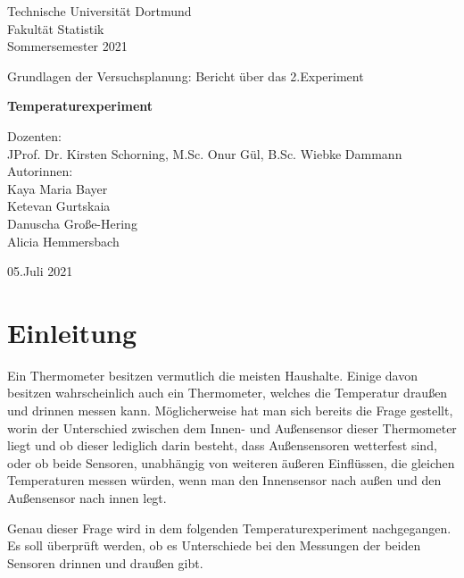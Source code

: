 \documentclass[ ngerman, fontsize= 12pt, paper=a4, headings=big, titlepage=true]{article}
\begin{document}
	
	
	\begin{center}
		\Large
		Technische Universität Dortmund\\
		Fakultät Statistik\\
		Sommersemester 2021\\
		
		\vspace{4em}
		
		Grundlagen der Versuchsplanung: Bericht über das 2.Experiment
		
		\Huge
		\textbf{Temperaturexperiment}
		
		\Large
		\vspace{5em}
		Dozenten:\\
		JProf. Dr. Kirsten Schorning, M.Sc. Onur Gül, B.Sc. Wiebke Dammann\\
		
		
		\vspace{8em}
		Autorinnen: \\
		Kaya Maria Bayer\\
		Ketevan Gurtskaia\\
		Danuscha Große-Hering\\	
		Alicia Hemmersbach\\
		
		
		
		\vspace{12em}
		
		05.Juli 2021
		
	\end{center}
	
	\newpage	
	
	\tableofcontents
	\newpage
	
	\section{Einleitung}
	Ein Thermometer besitzen vermutlich die meisten Haushalte. Einige davon besitzen wahrscheinlich auch ein Thermometer, welches die Temperatur draußen und drinnen messen kann. Möglicherweise hat man sich bereits die Frage gestellt, worin der Unterschied zwischen dem Innen- und Außensensor dieser Thermometer liegt und ob dieser lediglich darin besteht, dass Außensensoren wetterfest sind, oder ob beide Sensoren, unabhängig von weiteren äußeren Einflüssen, die gleichen Temperaturen messen würden, wenn man den Innensensor nach außen und den Außensensor nach innen legt. \newline 
	
	Genau dieser Frage wird in dem folgenden Temperaturexperiment nachgegangen. Es soll überprüft werden, ob es Unterschiede bei den Messungen der beiden Sensoren drinnen und draußen gibt. \newline
	
\end{document}
